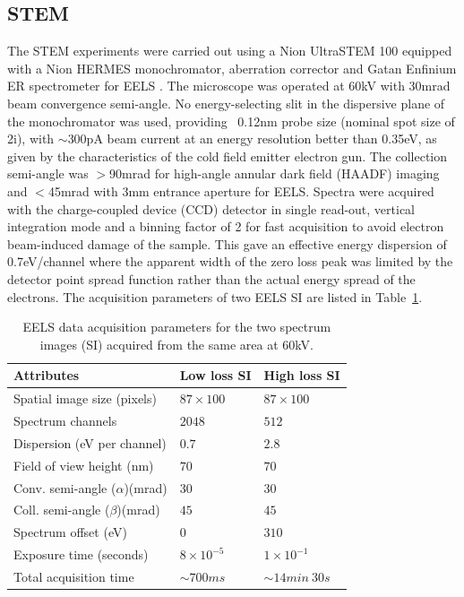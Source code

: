 \documentclass[%
aip,
rsi,%
 amsmath,amssymb,%
 reprint,%
]{revtex4-1}
\begin{document}
\subsection{STEM}
\label{sec:STEM}
The STEM experiments were carried out using a Nion UltraSTEM 100 equipped with a Nion HERMES monochromator, aberration corrector and Gatan Enfinium ER spectrometer for EELS \cite{Krivanek2013,Krivanek2015}. The microscope was operated at 60kV with 30mrad beam convergence semi-angle. No energy-selecting slit in the dispersive plane of the monochromator was used, providing  ~0.12nm probe size (nominal spot size of 2i), with $\sim$300pA beam current at an energy resolution better than 0.35eV, as given by the characteristics of the cold field emitter electron gun. The collection semi-angle was $>$90mrad for high-angle annular dark field (HAADF) imaging and $<$45mrad with 3mm entrance aperture for EELS. Spectra were acquired with the charge-coupled device (CCD) detector in single read-out, vertical integration mode and a binning factor of 2 for fast acquisition to avoid electron beam-induced damage of the sample. This gave an effective energy dispersion of 0.7eV/channel where the apparent width of the zero loss peak was limited by the detector point spread function rather than the actual energy spread of the electrons. The acquisition parameters of two EELS SI are listed in Table~\ref{tab:Attributes}.
\begin{table}%
	\caption{EELS data acquisition parameters for the two spectrum images (SI) acquired from the same area at $60$kV.}
    \label{tab:Attributes}
	\begin{ruledtabular}
		\begin{tabular}{lll}
			Attributes&Low loss SI&High loss SI							\\ \hline
			Spatial image size (pixels)&$87\times100$&$87\times100$ 	\\
            Spectrum channels		&$2048$&$512$						\\
			Dispersion (eV per channel)&$0.7$&$2.8$						\\
			Field of view height (nm) &$70$&$70$						\\
			Conv. semi-angle ($\alpha$)(mrad)&$30$&$30$					\\
			Coll. semi-angle ($\beta$)(mrad)&$45$&$45$					\\
			Spectrum offset (eV)&$0$&$310$								\\
			Exposure time (seconds)&$8\times10^{-5}$&$1\times10^{-1}$	\\
			Total acquisition time &$\sim700ms$&$\sim14min~30s$
		\end{tabular}
	\end{ruledtabular}
\end{table}
\end{document}

